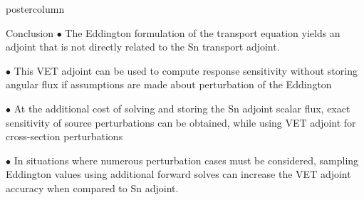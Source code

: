 \documentclass[xcolor={usenames,dvipsnames,svgnames,table}]{beamer}
\begin{document}
\begin{frame}
\begin{columns}
\begin{column}{.33\textwidth}
\begin{beamercolorbox}[center,wd=\textwidth]{postercolumn}
\begin{minipage}[T]{0.95\textwidth}
{\begin{block}{Conclusion}
$\bullet$ The Eddington formulation of the transport equation yields an adjoint that is not directly related to the Sn transport adjoint.
			    

$\bullet$ This VET adjoint can be used to compute response sensitivity without storing angular flux if assumptions are made about perturbation of the Eddington


$\bullet$ At the additional cost of solving and storing the Sn adjoint scalar flux, exact sensitivity of source perturbations can be obtained, while using VET adjoint for cross-section perturbations

$\bullet$ In situations where numerous perturbation cases must be considered, sampling Eddington values using additional forward solves can increase the VET adjoint accuracy when compared to Sn adjoint. 
			    \end{block}
			    \vfill
			}
			\end{minipage}
		\end{beamercolorbox}
	\end{column}

	\end{columns}
\end{frame}
\end{document}
